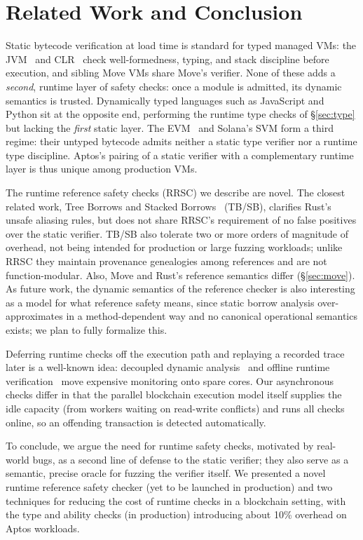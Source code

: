 \section{Related Work and Conclusion}
\label{sec:concl}

Static bytecode verification at load time is standard for typed managed VMs: the JVM~\cite{jvm} and CLR~\cite{clr} check well-formedness, typing, and stack discipline before execution, and sibling Move VMs share Move's verifier.
None of these adds a \emph{second}, runtime layer of safety checks: once a module is admitted, its dynamic semantics is trusted.
Dynamically typed languages such as JavaScript and Python sit at the opposite end, performing the runtime type checks of \S\ref{sec:type} but lacking the \emph{first} static layer.
The EVM~\cite{ethereum,kevm} and Solana's SVM form a third regime: their untyped bytecode admits neither a static type verifier nor a runtime type discipline.
Aptos's pairing of a static verifier with a complementary runtime layer is thus unique among production VMs.

The runtime reference safety checks (RRSC) we describe are novel.
The closest related work, Tree Borrows and Stacked Borrows~\cite{stackedborrows,treeborrows} (TB/SB), clarifies Rust's unsafe aliasing rules, but does not share RRSC's requirement of no false positives over the static verifier.
TB/SB also tolerate two or more orders of magnitude of overhead, not being intended for production or large fuzzing workloads; unlike RRSC they maintain provenance genealogies among references and are not function-modular.
Also, Move and Rust's reference semantics differ (\S\ref{sec:move}).
As future work, the dynamic semantics of the reference checker is also interesting as a model for what reference safety means, since static borrow analysis over-approximates in a method-dependent way and no canonical operational semantics exists; we plan to fully formalize this.

Deferring runtime checks off the execution path and replaying a recorded trace later is a well-known idea: decoupled dynamic analysis~\cite{aftersight,shadowreplica,straighttaint} and offline runtime verification~\cite{rvsurvey} move expensive monitoring onto spare cores.
Our asynchronous checks differ in that the parallel blockchain execution model itself supplies the idle capacity (from workers waiting on read-write conflicts) and runs all checks online, so an offending transaction is detected automatically.

To conclude, we argue the need for runtime safety checks, motivated by real-world bugs, as a second line of defense to the static verifier; they also serve as a semantic, precise oracle for fuzzing the verifier itself.
We presented a novel runtime reference safety checker (yet to be launched in production) and two techniques for reducing the cost of runtime checks in a blockchain setting, with the type and ability checks (in production) introducing about 10\% overhead on Aptos workloads.

